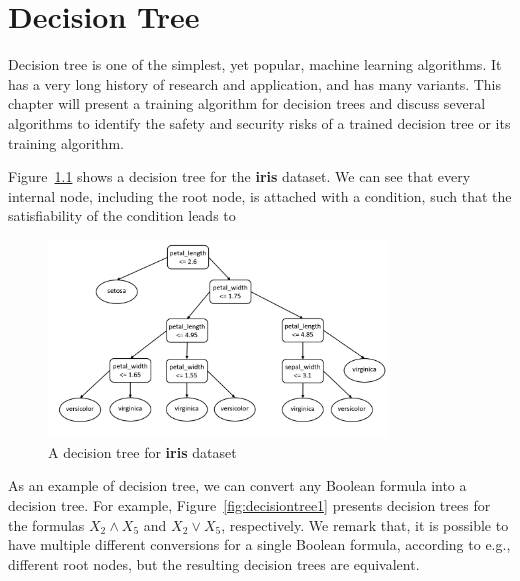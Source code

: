 \chapter{Decision Tree}

Decision tree is one of the simplest, yet popular, machine learning algorithms. It has a very long history of research and application, and has many variants. This chapter will present a training algorithm for decision trees and discuss several algorithms to identify the safety and security risks of a trained decision tree or its training algorithm. 


%
Figure~\ref{fig:decisionTreeIri} shows a decision tree for the \textbf{iris} dataset. We can see that every internal node, including the root node, is attached with a condition, such that the satisfiability of the condition leads to  

\begin{figure}[!thbp]
    \centering
    \includegraphics[width=0.8\textwidth]{images/simpleML/decisionTreeIris.png}
    \caption{A decision tree for \textbf{iris} dataset \cite{huang2020embedding}}
    \label{fig:decisionTreeIri}
\end{figure}


As an example of decision tree, we can convert any Boolean formula into a decision tree. For example, Figure~\ref{fig:decisiontree1} presents decision trees for the formulas $X_2\land X_5$ and $X_2\lor X_5$, respectively. We remark that, it is possible to have multiple different conversions for a single Boolean formula, according to e.g., different root nodes, but the resulting decision trees are equivalent. 

